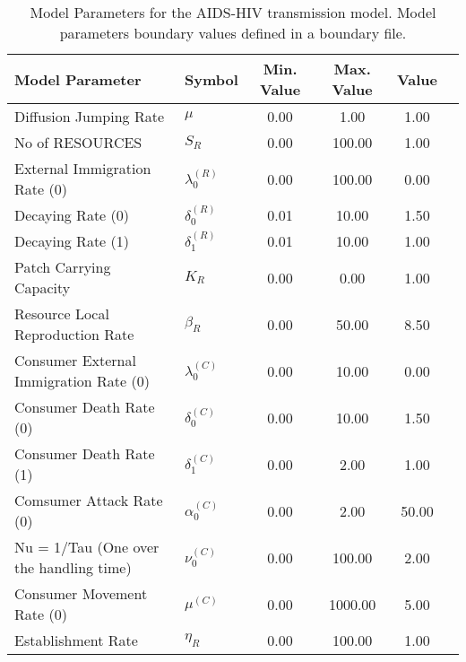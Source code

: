\begin{table}
\centering
\begin{tabular}{p{5cm}lcccc}
{\bf Model Parameter} & {\bf Symbol} & {\bf Min. Value} & {\bf Max. Value} & {\bf Value}\\
\hline\hline
Diffusion Jumping Rate & $\mu$ & 0.00 & 1.00 & 1.00\\
No of RESOURCES & $S_R$ & 0.00 & 100.00 & 1.00\\
External Immigration Rate (0) & $\lambda^{(R)}_0$ & 0.00 & 100.00 & 0.00\\
Decaying Rate (0) & $\delta^{(R)}_0$ & 0.01 & 10.00 & 1.50\\
Decaying Rate (1) & $\delta^{(R)}_1$ & 0.01 & 10.00 & 1.00\\
Patch Carrying Capacity & $K_R$ & 0.00 & 0.00 & 1.00\\
Resource Local Reproduction Rate & $\beta_R$ & 0.00 & 50.00 & 8.50\\
Consumer External Immigration Rate (0) & $\lambda^{(C)}_0$ & 0.00 & 10.00 & 0.00\\
Consumer Death Rate (0) & $\delta^{(C)}_0$ & 0.00 & 10.00 & 1.50\\
Consumer Death Rate (1) & $\delta^{(C)}_1$ & 0.00 & 2.00 & 1.00\\
Comsumer Attack Rate (0) & $\alpha^{(C)}_0$ & 0.00 & 2.00 & 50.00\\
Nu = 1/Tau (One over the handling time) & $\nu^{(C)}_0$ & 0.00 & 100.00 & 2.00\\
Consumer Movement Rate (0) & $\mu^{(C)}$ & 0.00 & 1000.00 & 5.00\\
Establishment Rate & $\eta_R$ & 0.00 & 100.00 & 1.00\\
\hline\hline
\end{tabular}
\caption{Model Parameters for the AIDS-HIV transmission model. Model parameters boundary values defined in a boundary file.}
\end{table}
